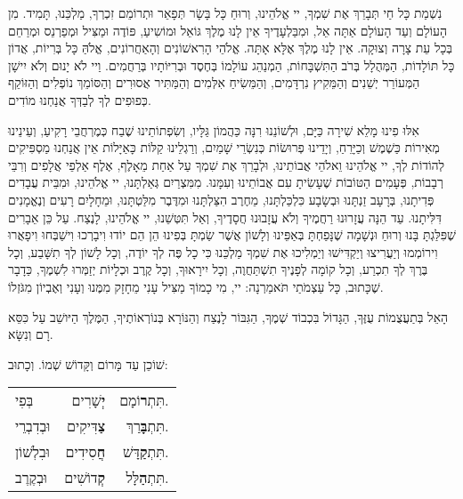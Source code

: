 נִשְׁמַת כָּל חַי תְּבָרֵךְ אֶת שִׁמְךָ, יי אֱלֹהֵינוּ, וְרוּחַ כָּל בָּשָׂר תְּפָאֵר וּתְרוֹמֵם זִכְרְךָ, מַלְכֵּנוּ, תָּמִיד. מִן הָעוֹלָם וְעַד הָעוֹלָם אַתָּה אֵל, וּמִבַּלְעָדֶיךָ אֵין לָנוּ מֶלֶךְ גּוֹאֵל וּמוֹשִיעַ, פּוֹדֶה וּמַצִּיל וּמְפַרְנֵס וּמְרַחֵם בְּכָל עֵת צָרָה וְצוּקָה. אֵין לָנוּ מֶלֶךְ אֶלָּא אָתָּה. אֱלֹהֵי הָרִאשׁוֹנִים וְהָאַחֲרוֹנִים, אֱלֹהַּ כָּל בְּרִיוֹת, אֲדוֹן כָּל תּוֹלָדוֹת, הַמְּהֻלָל בְּרֹב הַתִּשְׁבָּחוֹת, הַמְנַהֵג עוֹלָמוֹ בְּחֶסֶד וּבְרִיּוֹתָיו בְּרַחֲמִים. וַיי לֹא יָנוּם וְלֹא יִישָׁן הַמְּעוֹרֵר יְשֵׁנִים וְהַמֵּקִיץ נִרְדָּמִים, וְהַמֵּשִׂיחַ אִלְּמִים וְהַמַּתִּיר אֲסוּרִים וְהַסּוֹמֵךְ נוֹפְלִים וְהַזּוֹקֵף כְּפוּפִים לְךָ לְבַדְּךָ אֲנַחְנוּ מוֹדִים.

אִלּוּ פִינוּ מָלֵא שִׁירָה כַּיָּם, וּלְשׁוֹנֵנוּ רִנָּה כַּהֲמוֹן גַּלָּיו, וְשִׂפְתוֹתֵינוּ שֶׁבַח כְּמֶרְחֲבֵי רָקִיעַ, וְעֵינֵינוּ מְאִירוֹת כַּשֶׁמֶשׁ וְכַיָּרֵחַ, וְיָדֵינוּ פְרוּשׂוֹת כְּנִשְׂרֵי שָׁמַיִם, וְרַגְלֵינוּ קַלּוֹת כָּאַיָּלוֹת אֵין אֲנַחְנוּ מַסְפִּיקִים לְהוֹדוֹת לְךָ, יי אֱלֹהֵינוּ וֵאלֹהֵי אֲבוֹתֵינוּ, וּלְבָרֵךְ אֶת שִׁמְךָ עַל אַחַת מֵאָלֶף, אֶלֶף אַלְפֵי אֲלָפִים וְרִבֵּי רְבָבוֹת, פְּעָמִים הַטּוֹבוֹת שֶׁעָשִׂיתָ עִם אֲבוֹתֵינוּ וְעִמָּנוּ. מִמִּצְרַיִם גְּאַלְתָּנוּ, יי אֱלֹהֵינוּ, וּמִבֵּית עֲבָדִים פְּדִיתָנוּ, בְּרָעָב זַנְתָּנוּ וּבְשָׂבָע כִּלְכַּלְתָּנוּ, מֵחֶרֶב הִצַּלְתָּנוּ וּמִדֶּבֶר מִלַּטְתָּנוּ, וּמֵחָלָיִם רָעִים וְנֶאֱמָנִים דִּלִּיתָנוּ.
עַד הֵנָּה עֲזָרוּנוּ רַחֲמֶיךָ וְלֹא עֲזָבוּנוּ חֲסָדֶיךָ, וְאַל תִּטְּשֵׁנוּ, יי אֱלֹהֵינוּ, לָנֶצַח. עַל כֵּן אֵבָרִים שֶׁפִּלַּגְתָּ בָּנוּ וְרוּחַ וּנְשָׁמָה שֶׁנָּפַחְתָּ בְּאַפֵּינוּ וְלָשׁוֹן אֲשֶׁר שַׂמְתָּ בְּפִינוּ הֵן הֵם יוֹדוּ וִיבָרְכוּ וִישַׁבְּחוּ וִיפָאֲרוּ וִירוֹמְמוּ וְיַעֲרִיצוּ וְיַקְדִּישׁוּ וְיַמְלִיכוּ אֶת שִׁמְךָ מַלְכֵּנוּ כִּי כָל פֶּה לְךָ יוֹדֶה, וְכָל לָשׁוֹן לְךָ תִשָּׁבַע, וְכָל בֶּרֶךְ לְךָ תִכְרַע, וְכָל קוֹמָה לְפָנֶיךָ תִשְׁתַּחֲוֶה, וְכָל יִירָאוּךָ, וְכָל קֶרֶב וּכְלָיוֹת יְזַמְּרוּ לִשְׁמֶךָ, כַּדָבָר שֶׁכָּתוּב, כָּל עַצְמֹתַי תֹּאמַרְנָה: יי, מִי כָמוֹךָ מַצִּיל עָנִי מֵחָזָק מִמֶּנוּ וְעָנִי וְאֶבְיוֹן מִגֹּזְלוֹ.

\vspace{1em}

הָאֵל בְּתַעֲצֻמוֹת עֻזֶּךָ, הַגָּדוֹל בִּכְבוֹד שְׁמֶךָ, הַגִּבּוֹר לָנֶצַח וְהַנּוֹרָא בְּנוֹרְאוֹתֶיךָ, הַמֶּלֶךְ הַיּושֵׁב עַל כִּסֵּא רָם וְנִשָּׂא.

שׁוֹכֵן עַד מָּרוֹם וְקָּדוֹשׁ שְׁמוֹ. וְכָתוּב: 

\begin{center}
\begin{tabular}{l r r}
בְּפִי & {\large \bfseries יְ}שָׁרִים & תִּתְ{\large \bfseries ר}וֹמָם. \\
וּבְדִבְרֵי & {\large \bfseries צַ}דִּיקִים & תִּתְ{\large \bfseries בָּ}רַךְ. \\
וּבִלְשׁוֹן & {\large \bfseries חֲ}סִידִים & תִּתְ{\large \bfseries קַ}דָּשׁ. \\
וּבְקֶרֶב & {\large \bfseries קְ}דוֹשִׁים & תִּתְ{\large \bfseries הַ}לָּל. \\
\end{tabular}
\end{center}

